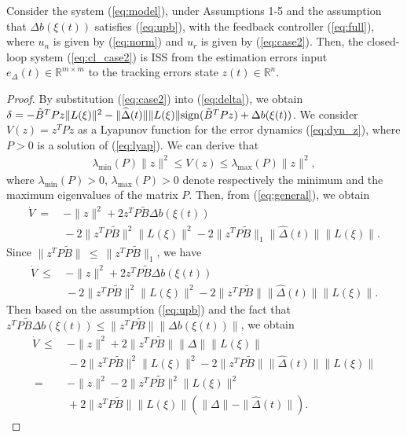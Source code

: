 \documentclass[twoside,leqno,onecolumn]{article}
\begin{document}
\begin{theorem}
\label{thm:case2}
Consider the system (\ref{eq:model}), under Assumptions 1-5 and
the assumption that $\Delta b(\xi(t))$ satisfies (\ref{eq:upb}),
with the feedback controller (\ref{eq:full}), where $u_n$ is given
by (\ref{eq:norm}) and $u_r$ is given by (\ref{eq:case2}). Then,
the closed-loop system (\ref{eq:cl_case2}) is ISS from the
estimation errors input $e_\Delta(t)\in\mathbb{R}^{m\times m}$ to
the tracking errors state $z(t)\in\mathbb{R}^n$.
\end{theorem}

\begin{proof}
By substitution (\ref{eq:case2}) into (\ref{eq:delta}), we obtain
$\delta=-\tilde B ^TP z\|L(\xi)\|^2 -
\|\widehat{\Delta}(t)\|\|L(\xi)\|{\rm{sign} }  (\tilde B ^TP z) +
\Delta b(\xi(t))$. We consider $V(z) =z^TPz$ as a Lyapunov
function for the error dynamics (\ref{eq:dyn_z}), where $P>0$ is a
solution of (\ref{eq:lyap}). We can derive that
\begin{align}
\label{eq:storage} {\lambda}_{\min}(P)\|z\|^2\leq V(z)\leq
{\lambda}_{\max}(P)\|z\|^2,
\end{align}
where ${\lambda}_{\min}(P)>0$,  ${\lambda}_{\max}(P)>0$ denote
respectively the minimum and the maximum eigenvalues of the matrix
$P$. Then, from (\ref{eq:general}), we obtain
\begin{align*}
\dot{V}
~=&~ -\|z\|^2 + 2 z^T P \tilde B \Delta b(\xi(t))\\
&~-2\|z^T P \tilde B\|^2\|L(\xi)\|^2-2\|z^T P \tilde B\|_1\|\widehat{\Delta }(t)\|\|L(\xi)\|.
\end{align*}
Since $\|z^T P \tilde B\|~\leq~\|z^T P \tilde B\|_1$, we have
\begin{align*}
\dot{V}
~\leq&~ -\|z\|^2 + 2 z^T P \tilde B \Delta b(\xi(t))\\
&~-2\|z^T P \tilde B\|^2\|L(\xi)\|^2-2\|z^T P \tilde B\|\|\widehat{\Delta }(t)\|\|L(\xi)\|.
\end{align*}
Then based on the assumption (\ref{eq:upb}) and the fact that $z^T
P \tilde B \Delta b(\xi(t)) \leq \|z^T P \tilde B\|\| \Delta
b(\xi(t))\|$, we obtain
\begin{align*}
\dot{V}
~\leq&~ -\|z\|^2 + 2 \|z^T P \tilde B\| \|\Delta \|\|L(\xi)\|\\
&~-2\|z^T P \tilde B\|^2\|L(\xi)\|^2-2\|z^T P \tilde B\|\|\widehat{\Delta }(t)\|\|L(\xi)\|\\
~=&~-\|z\|^2-2\|z^T P \tilde B\|^2\|L(\xi)\|^2\\
&~+ 2 \|z^T P \tilde B\| \|L(\xi)\|(\|\Delta \|-\|\widehat{\Delta }(t)\|).

\end{align*}
\end{proof}
\end{document}
